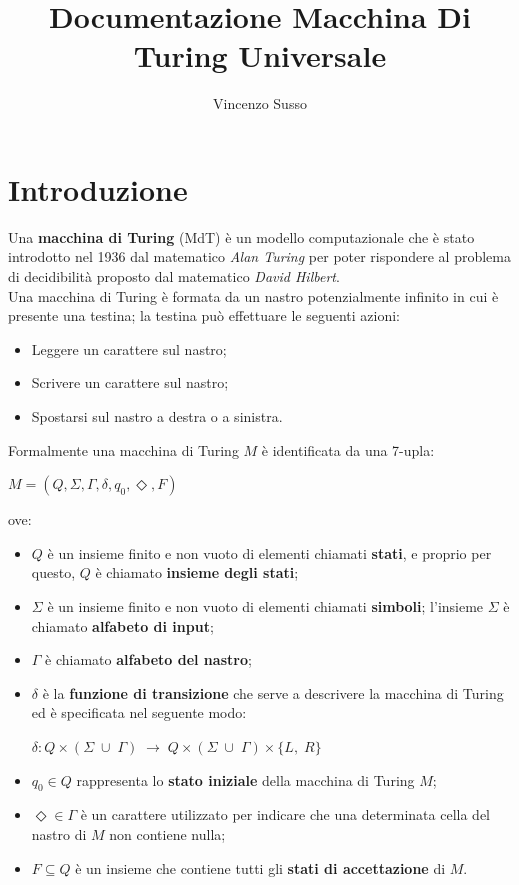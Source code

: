 \documentclass[a4paper,12pt,titlepage,oneside]{book}
\begin{document}
	\title{Documentazione Macchina Di Turing Universale}
	\author{Vincenzo Susso}
	\maketitle
	
	\tableofcontents
	
	\chapter{Introduzione}
	
Una \textbf{macchina di Turing} (MdT) è un modello computazionale che è stato introdotto nel 1936 dal matematico \emph{Alan Turing} per poter rispondere al problema di decidibilità proposto dal matematico \emph{David Hilbert}.\\
Una macchina di Turing è formata da un nastro potenzialmente infinito in cui è presente una testina; la testina può effettuare le seguenti azioni:

\begin{itemize}
	\item Leggere un carattere sul nastro;
	\item Scrivere un carattere sul nastro;
	\item Spostarsi sul nastro a destra o a sinistra.
\end{itemize}

Formalmente una macchina di Turing $M$ è identificata da una 7-upla:

\begin{center}
	$M = (Q, \Sigma, \Gamma, \delta, q_0, \Diamond, F)$
\end{center}

ove:

\begin{itemize}
	\item $Q$ è un insieme finito e non vuoto di elementi chiamati \textbf{stati}, e proprio per questo, $Q$ è chiamato \textbf{insieme degli stati};
	\item $\Sigma$ è un insieme finito e non vuoto di elementi chiamati \textbf{simboli}; l'insieme $\Sigma$ è chiamato \textbf{alfabeto di input};
	\item $\Gamma$ è chiamato \textbf{alfabeto del nastro};
	\item $\delta$ è la \textbf{funzione di transizione} che serve a descrivere la macchina di Turing ed è specificata nel seguente modo:
	
	\begin{center}
		$\delta : Q \times (\Sigma \; \cup \; \Gamma) \; \rightarrow \; Q \times (\Sigma \; \cup \; \Gamma) \times \{L,\;R\}$	
	\end{center}

	\item $q_0 \in Q$ rappresenta lo \textbf{stato iniziale} della macchina di Turing $M$;
	\item $\Diamond \in \Gamma$ è un carattere utilizzato per indicare che una determinata cella del nastro di $M$ non contiene nulla;
	\item $F \subseteq Q$ è un insieme che contiene tutti gli \textbf{stati di accettazione} di $M$.
\end{itemize}
\end{document}
